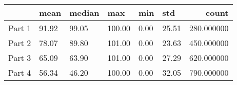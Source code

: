 \begin{tabular}{llllllr}
\toprule
 & mean & median & max & min & std & count \\
\midrule
Part 1 & 91.92 & 99.05 & 100.00 & 0.00 & 25.51 & 280.000000 \\
Part 2 & 78.07 & 89.80 & 101.00 & 0.00 & 23.63 & 450.000000 \\
Part 3 & 65.09 & 63.90 & 101.00 & 0.00 & 27.29 & 620.000000 \\
Part 4 & 56.34 & 46.20 & 100.00 & 0.00 & 32.05 & 790.000000 \\
\bottomrule
\end{tabular}
